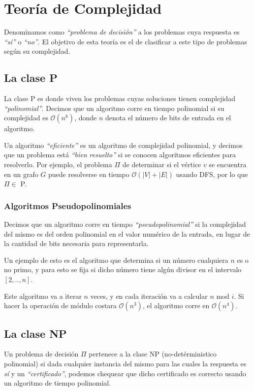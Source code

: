 \newpage
\section{Teor\'ia de Complejidad}

Denominamos como \emph{``problema de decisi\'on''} a los problemas cuya respuesta es \emph{``s\'i''} o \emph{``no''}. El objetivo de esta teor\'ia es el de clasificar a este tipo de problemas seg\'un su complejidad.

\subsection{La clase P}

La clase P es donde viven los problemas cuyas soluciones tienen complejidad \emph{``polinomial''}. Decimos que un algoritmo corre en tiempo polinomial si su complejidad es $\mathcal{O}(n^k)$, donde $n$ denota el n\'umero de bits de entrada en el algoritmo.

Un algoritmo \emph{``eficiente''} es un algoritmo de complejidad polinomial, y decimos que un problema est\'a \emph{``bien resuelto''} si se conocen algoritmos eficientes para resolverlo. Por ejemplo, el problema $\Pi$ de determinar si el v\'ertice $v$ se encuentra en un grafo $G$ puede resolverse en tiempo $\mathcal{O}(|V|+|E|)$ usando DFS, por lo que $\Pi \in$ P.

\subsubsection{Algoritmos Pseudopolinomiales}

Decimos que un algoritmo corre en tiempo \emph{``pseudopolinomial''} si la complejidad del mismo es del orden polinomial en el valor num\'erico de la entrada, en lugar de la cantidad de bits necesaria para representarla.

Un ejemplo de esto es el algoritmo que determina si un n\'umero cualquiera $n$ es o no primo, y para esto se fija si dicho n\'umero tiene alg\'un divisor en el intervalo $[2, .., n]$.

Este algoritmo va a iterar $n$ veces, y en cada iteraci\'on va a calcular $n \textrm{ mod } i$. Si hacer la operaci\'on de m\'odulo costara $\mathcal{O}(n^3)$, el algoritmo corre en $\mathcal{O}(n^4)$.
\subsection{La clase NP}

Un problema de decisi\'on $\Pi$ pertenece a la clase NP (no-det\'erministico polinomial) si dada cualquier instancia del mismo para las cuales la respuesta es \emph{s\'i} y un \emph{``certificado''}, podemos chequear que dicho certificado es correcto usando un algoritmo de tiempo polinomial.

